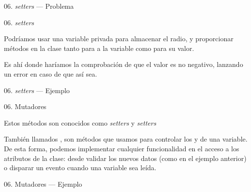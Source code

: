 \begin{frame}{06. \textit{setters} — Problema}
  \footnotesize
\end{frame}

\begin{frame}{06. \textit{setters}}
  \begin{block}{}
    \centering
     Podríamos usar una variable privada para almacenar el radio, y
     proporcionar métodos en la clase tanto para  a
     la variable como para  su valor.
  \end{block}

  \begin{center}
    \small
    Es ahí donde haríamos la comprobación de que el valor es no
    negativo, lanzando un error en caso de que así sea.
  \end{center}
\end{frame}

\begin{frame}{06. \textit{setters} — Ejemplo}
  \scriptsize
\end{frame}

\begin{frame}{06. Mutadores}
  \begin{block}{}
    \centering
    Estos métodos son conocidos como \textit{setters} y \textit{setters}
  \end{block}

  \begin{justify}
    \small
    También llamados , son métodos que usamos
    para controlar los  y  de
    una variable. De esta forma, podemos implementar cualquier
    funcionalidad en el acceso a los atributos de la clase: desde
    validar los nuevos datos (como en el ejemplo anterior) o disparar
    un evento cuando una variable sea leída.
  \end{justify}
\end{frame}

\begin{frame}{06. Mutadores — Ejemplo}
  \footnotesize
\end{frame}

